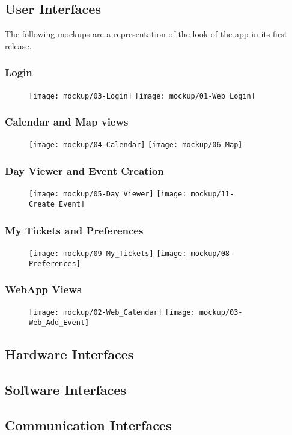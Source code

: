 \subsection{User Interfaces}
\label{subsect:User Interfaces}
	The following mockups are a representation of the look of the app in its first release.
	\subsubsection{Login}
	\begin{figure}[H]
	\texttt{[image: mockup/03-Login]}
	\vspace{2.5cm}
	\texttt{[image: mockup/01-Web\_Login]}
	\centering 
	\end{figure}
	
	\subsubsection{Calendar and Map views}
	\begin{figure}[H]
	\texttt{[image: mockup/04-Calendar]}
	\hspace{2.5cm}
	\texttt{[image: mockup/06-Map]}
	\centering 
	\end{figure}
	
	\subsubsection{Day Viewer and Event Creation}
	\begin{figure}[H]
	\texttt{[image: mockup/05-Day\_Viewer]}
	\hspace{2.5cm}
	\texttt{[image: mockup/11-Create\_Event]}
	\centering 
	\end{figure}
	
	\subsubsection{My Tickets and Preferences}
	\begin{figure}[H]
	\texttt{[image: mockup/09-My\_Tickets]}
	\hspace{2.5cm}
	\texttt{[image: mockup/08-Preferences]}
	\centering 
	\end{figure}
	
	\subsubsection{WebApp Views}
	\begin{figure}[H]
	\texttt{[image: mockup/02-Web\_Calendar]}
	\vspace{2.5cm}
	\texttt{[image: mockup/03-Web\_Add\_Event]}
	\centering 
	\end{figure}
\subsection{Hardware Interfaces}
\label{subsect:Hardware Interfaces}
\subsection{Software Interfaces}
\label{subsect:Software Interfaces}
\subsection{Communication Interfaces}
\label{subsect:Communication Interfaces}
